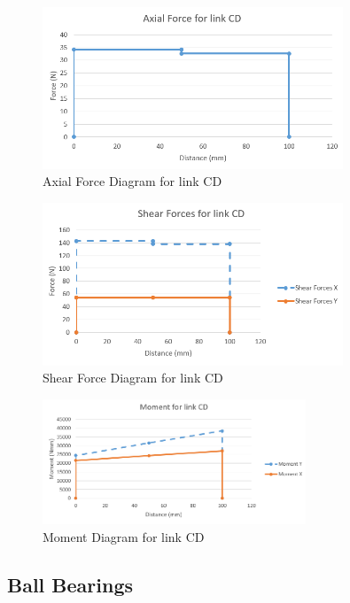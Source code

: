 \begin{figure}[H]
    \centering
    \includegraphics[width=0.8\textwidth]{7_Appendices/Images/CD_Axial.PNG}
    \caption{Axial Force Diagram for link CD}
    \label{fig:annex_limb_CD_axial}
\end{figure}
\begin{figure}[H]
    \centering
    \includegraphics[width=0.8\textwidth]{7_Appendices/Images/CD_Shear.PNG}
    \caption{Shear Force Diagram for link CD}
    \label{fig:annex_limb_CD_shear}
\end{figure}
\begin{figure}[H]
    \centering
    \includegraphics[width=0.7\textwidth]{7_Appendices/Images/CD_Moment.PNG}
    \caption{Moment Diagram for link CD}
    \label{fig:annex_limb_CD_moment}
\end{figure}


\subsection{Ball Bearings} \label{app:ball_bearing}

